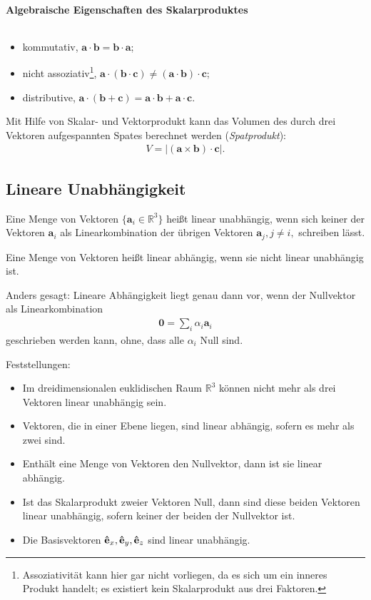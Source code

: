 \paragraph{Algebraische Eigenschaften des Skalarproduktes}$~$

\begin{itemize}
    \item kommutativ, $\bm{a}\cdot \bm{b} = \bm{b}\cdot\bm{a}$; 
    \item nicht assoziativ\footnote{Assoziativität kann hier gar nicht vorliegen, da es sich um ein inneres Produkt handelt; es existiert kein Skalarprodukt aus drei Faktoren.}, $\bm{a}\cdot (\bm{b}\cdot\bm{c}) \neq (\bm{a}\cdot\bm{b})\cdot\bm{c}$;
    \item distributive, $\bm{a}\cdot (\bm{b}+\bm{c}) = \bm{a}\cdot\bm{b}+\bm{a}\cdot\bm{c}$.
\end{itemize}
Mit Hilfe von Skalar- und Vektorprodukt kann das Volumen des durch drei Vektoren aufgespannten Spates berechnet werden (\emph{Spatprodukt}): 
\begin{align}
    V = |(\bm{a}\times\bm{b}) \cdot\bm{c}|.
\end{align}

\subsection{Lineare Unabhängigkeit}
Eine Menge von Vektoren $\{\bm{a}_i \in \mathbb{R}^3\}$ heißt linear unabhängig, wenn sich keiner der Vektoren $\bm{a}_i$ als Linearkombination der übrigen Vektoren $\bm{a}_j, j \neq i,$ schreiben lässt. 

Eine Menge von Vektoren heißt linear abhängig, wenn sie nicht linear unabhängig ist. 

Anders gesagt: Lineare Abhängigkeit liegt genau dann vor, wenn der Nullvektor als Linearkombination 
\begin{align}
    \bm{0} = \sum_i \alpha_i \bm{a}_i
\end{align}
geschrieben werden kann, ohne, dass alle $\alpha_i$ Null sind.

Feststellungen: 
\begin{itemize}
    \item Im dreidimensionalen euklidischen Raum $\mathbb{R}^3$ können nicht mehr als drei Vektoren linear unabhängig sein. 
    \item Vektoren, die in einer Ebene liegen, sind linear abhängig, sofern es mehr als zwei sind. 
    \item Enthält eine Menge von Vektoren den Nullvektor, dann ist sie linear abhängig. 
    \item Ist das Skalarprodukt zweier Vektoren Null, dann sind diese beiden Vektoren linear unabhängig, sofern keiner der beiden der Nullvektor ist. 
    \item Die Basisvektoren $\vu{e}_x, \vu{e}_y, \vu{e}_z$ sind linear unabhängig.
\end{itemize}

